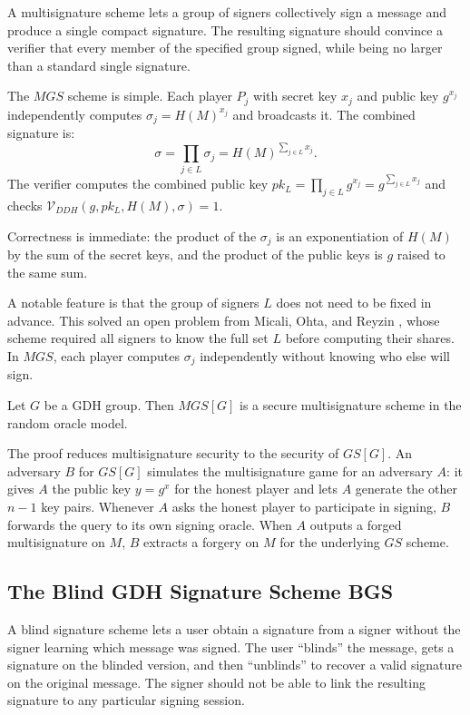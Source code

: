 A multisignature scheme lets a group of signers collectively sign a message and produce a
single compact signature. The resulting signature should convince a verifier that every
member of the specified group signed, while being no larger than a standard single
signature.

The $MGS$ scheme is simple. Each player $P_j$ with secret key $x_j$ and public key
$g^{x_j}$ independently computes $\sigma_j = H(M)^{x_j}$ and broadcasts it. The
combined signature is:
\[
    \sigma = \prod_{j \in L} \sigma_j = H(M)^{\sum_{j \in L} x_j}.
\]
The verifier computes the combined public key $pk_L = \prod_{j \in L} g^{x_j} =
g^{\sum_{j \in L} x_j}$ and checks $\mathcal{V}_{DDH}(g, pk_L, H(M), \sigma) = 1$.

Correctness is immediate: the product of the $\sigma_j$ is an exponentiation of $H(M)$
by the sum of the secret keys, and the product of the public keys is $g$ raised to the
same sum.

A notable feature is that the group of signers $L$ does not need to be fixed in advance.
This solved an open problem from Micali, Ohta, and Reyzin \cite{MOR}, whose scheme
required all signers to know the full set $L$ before computing their shares. In $MGS$,
each player computes $\sigma_j$ independently without knowing who else will sign.

\begin{theorem}
Let $G$ be a GDH group. Then $MGS[G]$ is a secure multisignature scheme in the random
oracle model.
\end{theorem}

The proof reduces multisignature security to the security of $GS[G]$. An adversary $B$
for $GS[G]$ simulates the multisignature game for an adversary $A$: it gives $A$ the
public key $y = g^x$ for the honest player and lets $A$ generate the other $n-1$ key
pairs. Whenever $A$ asks the honest player to participate in signing, $B$ forwards the
query to its own signing oracle. When $A$ outputs a forged multisignature on $M$, $B$
extracts a forgery on $M$ for the underlying $GS$ scheme.

\subsection{The Blind GDH Signature Scheme BGS}

A blind signature scheme lets a user obtain a signature from a signer without the signer
learning which message was signed. The user ``blinds'' the message, gets a signature on
the blinded version, and then ``unblinds'' to recover a valid signature on the original
message. The signer should not be able to link the resulting signature to any particular
signing session.

